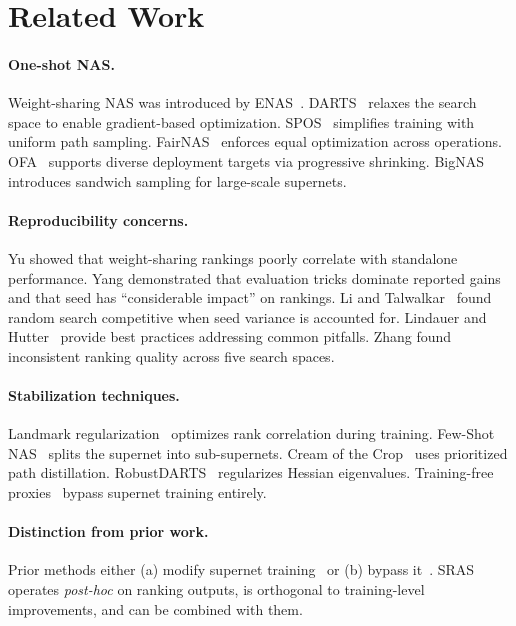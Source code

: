 \documentclass[10pt,twocolumn,letterpaper]{article}
\newcommand{\method}{SRAS}
\begin{document}
\section{Related Work}
\label{sec:related}

\paragraph{One-shot NAS.}
Weight-sharing NAS was introduced by ENAS~\cite{pham2018enas}. DARTS~\cite{liu2019darts} relaxes the search space to enable gradient-based optimization. SPOS~\cite{guo2020spos} simplifies training with uniform path sampling. FairNAS~\cite{chu2021fairnas} enforces equal optimization across operations. OFA~\cite{cai2020ofa} supports diverse deployment targets via progressive shrinking. BigNAS~\cite{yu2020bignas} introduces sandwich sampling for large-scale supernets.

\paragraph{Reproducibility concerns.}
Yu \etal\cite{yu2020evaluating} showed that weight-sharing rankings poorly correlate with standalone performance.
Yang \etal\cite{yang2020nas} demonstrated that evaluation tricks dominate reported gains and that seed has ``considerable impact'' on rankings.
Li and Talwalkar~\cite{li2020random} found random search competitive when seed variance is accounted for.
Lindauer and Hutter~\cite{lindauer2020best} provide best practices addressing common pitfalls.
Zhang \etal\cite{zhang2021supernet} found inconsistent ranking quality across five search spaces.

\paragraph{Stabilization techniques.}
Landmark regularization~\cite{yu2021landmark} optimizes rank correlation during training. Few-Shot NAS~\cite{zhao2021fewshot} splits the supernet into sub-supernets. Cream of the Crop~\cite{peng2020cream} uses prioritized path distillation. RobustDARTS~\cite{zela2020robustdarts} regularizes Hessian eigenvalues. Training-free proxies~\cite{mellor2021naswithouttraining,lin2021zennas} bypass supernet training entirely.

\paragraph{Distinction from prior work.}
Prior methods either (a) modify supernet training~\cite{yu2021landmark,zhao2021fewshot} or (b) bypass it~\cite{mellor2021naswithouttraining}. \method{} operates \textit{post-hoc} on ranking outputs, is orthogonal to training-level improvements, and can be combined with them.
\end{document}
